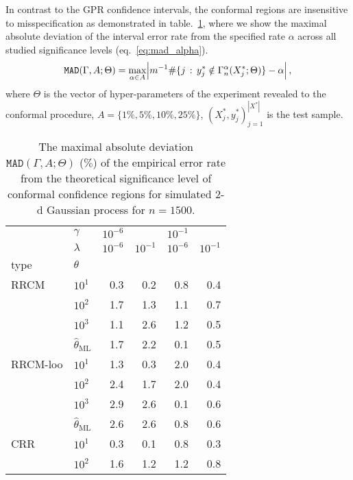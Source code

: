 \documentclass[conference]{IEEEtran}
\begin{document}
In contrast to the GPR confidence intervals, the conformal regions are insensitive
to misspecification as demonstrated in table.~\ref{tab:gaussian_2d_cov_conf}, where
we show the maximal absolute deviation of the interval error rate from the specified
rate $\alpha$ across all studied significance levels (eq.~\ref{eq:mad_alpha}).
\begin{equation} \label{eq:mad_alpha}
  \mathtt{MAD}(\Gamma, A; \Theta)
  = \max_{\alpha\in A}\Bigl\lvert
    m^{-1}\#\{j\,:\, y^*_j\notin \Gamma^\alpha_n(X^*_j; \Theta)\} - \alpha
  \Bigr\rvert
    \,,
\end{equation}
where $\Theta$ is the vector of hyper-parameters of the experiment revealed to the
conformal procedure, $A = \{1\%, 5\%, 10\%, 25\%\}$, $(X^*_j, y^*_j)_{j=1}^{|X^*|}$
is the test sample.
\begin{table}
  \centering
  \caption{The maximal absolute deviation $\mathtt{MAD}(\Gamma, A; \Theta)$ ($\%$)
  of the empirical error rate from the theoretical significance level of conformal
  confidence regions for simulated $2$-d Gaussian process for $n=1500$.}
  \label{tab:gaussian_2d_cov_conf}
  \begin{tabular}{ll||rrrr}
  \toprule
       & $\gamma$ & $10^{-6}$ &          & $10^{-1}$ &          \\\cline{2-2}
       & $\lambda$ & $10^{-6}$ & $10^{-1}$ & $10^{-6}$ & $10^{-1}$ \\\cline{2-2}
  type & $\theta$ &          &          &          &          \\
  \midrule
  RRCM & $10^1$ &      0.3 &      0.2 &      0.8 &      0.4 \\
       & $10^2$ &      1.7 &      1.3 &      1.1 &      0.7 \\
       & $10^3$ &      1.1 &      2.6 &      1.2 &      0.5 \\
       & $\hat{\theta}_\text{ML}$ &      1.7 &      2.2 &      0.1 &      0.5 \\
  \midrule
  RRCM-loo & $10^1$ &      1.3 &      0.3 &      2.0 &      0.4 \\
       & $10^2$ &      2.4 &      1.7 &      2.0 &      0.4 \\
       & $10^3$ &      2.9 &      2.6 &      0.1 &      0.6 \\
       & $\hat{\theta}_\text{ML}$ &      2.6 &      2.6 &      0.8 &      0.6 \\
  \midrule
  CRR & $10^1$ &      0.3 &      0.1 &      0.8 &      0.3 \\
       & $10^2$ &      1.6 &      1.2 &      1.2 &      0.8 \\

\end{tabular}
\end{table}
\end{document}
